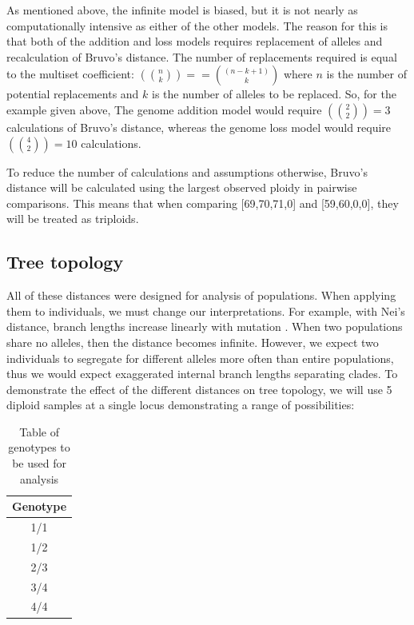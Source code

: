 \documentclass[letterpaper]{article}\usepackage[]{graphicx}\usepackage[]{color}
\begin{document}
As mentioned above, the infinite model is biased, but it is not nearly as
computationally intensive as either of the other models. The reason for this is
that both of the addition and loss models requires replacement of alleles and
recalculation of Bruvo's distance. The number of replacements required is equal
to the multiset coefficient: $\left({n \choose k}\right) == {(n-k+1) \choose k}$
where $n$ is the number of potential replacements and $k$ is the number of
alleles to be replaced. So, for the example given above, The genome addition
model would require $\left({2 \choose 2}\right) = 3$ calculations of Bruvo's
distance, whereas the genome loss model would require $\left({4 \choose
2}\right) = 10$ calculations.

To reduce the number of calculations and assumptions otherwise, Bruvo's distance
will be calculated using the largest observed ploidy in pairwise comparisons. 
This means that when
comparing [69,70,71,0] and [59,60,0,0], they will be treated as triploids.

\subsection{Tree topology}

All of these distances were designed for analysis of populations. When applying
them to individuals, we must change our interpretations. For example, with Nei's
distance, branch lengths increase linearly with mutation
\cite{nei1972genetic,nei1978estimation}. When two populations share no alleles,
then the distance becomes infinite. However, we expect two individuals to
segregate for different alleles more often than entire populations, thus we
would expect exaggerated internal branch lengths separating clades. To
demonstrate the effect of the different distances on tree topology, we will use
5 diploid samples at a single locus demonstrating a range of possibilities:

\begin{table}[ht]
\centering
\begin{tabular}{c}
  \hline
Genotype \\ 
  \hline
1/1 \\ 
  1/2 \\ 
  2/3 \\ 
  3/4 \\ 
  4/4 \\ 
   \hline
\end{tabular}
\caption{Table of genotypes to be used for analysis} 
\end{table}
\end{document}
